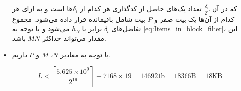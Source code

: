 \begin{itemize}
{که در آن 
$\frac{\delta_i}{2^P}$
تعداد یک‌های حاصل از کدگذاری هر کدام از 
$\delta_i$ها
است و به ازای هر کدام از آن‌ها یک بیت صفر و $P$ بیت شامل باقیمانده قرار داده می‌شود. مجموع تفاضل‌های $ \delta_i $ برابر با $h_N$ می‌شود و با توجه به \eqref{eq:Items_in_block_filter}، این مقدار می‌تواند حداکثر $MN$ باشد.

}
%
%
%
%
%
% 
%
%
%

\item{%
با توجه به مقادیر $N$، $M$ و $P$ داریم:

\begin{equation}
\label{E_L_3_block_filter}
L < \left[\frac{5.625 \times 10^{9}}{2^{19}}\right] + 7168 \times 19 = 146921\text{b} = 18366\text{B} = 18\text{KB}
\end{equation}


}
 \end{itemize}

